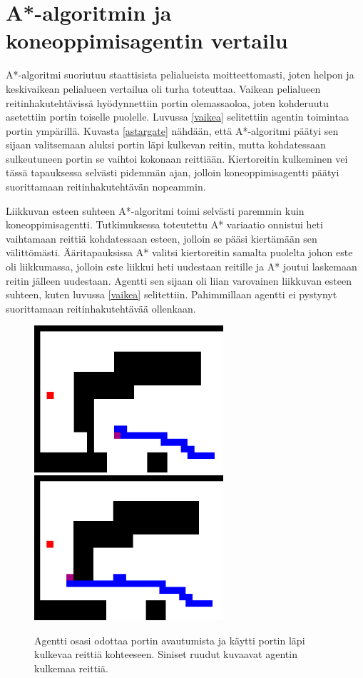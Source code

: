 \documentclass[utf8]{gradu3}
\begin{document}
\section{A*-algoritmin ja koneoppimisagentin vertailu}
\label{vertailu}

A*-algoritmi suoriutuu staattisista pelialueista moitteettomasti, joten helpon ja keskivaikean pelialueen vertailua oli turha toteuttaa. Vaikean pelialueen reitinhakutehtävissä hyödynnettiin portin olemassaoloa, joten kohderuutu asetettiin portin toiselle puolelle. Luvussa \ref{vaikea} selitettiin agentin toimintaa portin ympärillä. Kuvasta \ref{astargate} nähdään, että A*-algoritmi päätyi sen sijaan valitsemaan aluksi portin läpi kulkevan reitin, mutta kohdatessaan sulkeutuneen portin se vaihtoi kokonaan reittiään. Kiertoreitin kulkeminen vei tässä tapauksessa selvästi pidemmän ajan, jolloin koneoppimisagentti päätyi suorittamaan reitinhakutehtävän nopeammin.

Liikkuvan esteen suhteen A*-algoritmi toimi selvästi paremmin kuin koneoppimisagentti. Tutkimuksessa toteutettu A* variaatio onnistui heti vaihtamaan reittiä kohdatessaan esteen, jolloin se pääsi kiertämään sen välittömästi. Ääritapauksissa A* valitsi kiertoreitin samalta puolelta johon este oli liikkumassa, jolloin este liikkui heti uudestaan reitille ja A* joutui laskemaan reitin jälleen uudestaan. Agentti sen sijaan oli liian varovainen liikkuvan esteen suhteen, kuten luvussa \ref{vaikea} selitettiin. Pahimmillaan agentti ei pystynyt suorittamaan reitinhakutehtävää ollenkaan.

\begin{figure}[h]
\includegraphics[width=7cm]{agent_avoid_gate.png}
\hspace{1 cm}
\includegraphics[width=7cm]{agent_through_gate.png}
\caption{Agentti osasi odottaa portin avautumista ja käytti portin läpi kulkevaa reittiä kohteeseen. Siniset ruudut kuvaavat agentin kulkemaa reittiä.}
\label{agentgate}
\end{figure}
\end{document}
